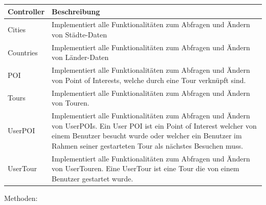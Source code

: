 \documentclass[a4paper,10pt,xetex]{article}
\begin{document}
\begin{longtabu} to \textwidth { | l | X[l] | }
  \hline
  \textbf{Controller} & \textbf{Beschreibung} \\
  \hline
  \endhead

   Cities &
  Implementiert alle Funktionalit\"aten zum Abfragen und \"Andern von St\"adte-Daten\\ \hline
  Countries &
  Implementiert alle Funktionalit\"aten zum Abfragen und \"Andern von L\"ander-Daten\\ \hline
    POI &
  Implementiert alle Funktionalit\"aten zum Abfragen und \"Andern von Point of Interests, welche
    durch eine Tour verkn\"upft sind.\\\hline
  Tours &
  Implementiert alle Funktionalit\"aten zum Abfragen und \"Andern von Touren.\\\hline
    UserPOI &
  Implementiert alle Funktionalit\"aten zum Abfragen und \"Andern von UserPOIs. Ein User POI ist
    ein Point of Interest welcher von einem Benutzer besucht wurde oder welcher ein Benutzer im Rahmen seiner gestarteten
    Tour als n\"achstes Besuchen muss.\\\hline
  UserTour &
  Implementiert alle Funktionalit\"aten zum Abfragen und \"Andern von UserTouren. Eine UserTour
    ist eine Tour die von einem Benutzer gestartet wurde.\\\hline
\end{longtabu}

\bigskip

Methoden:
\end{document}
